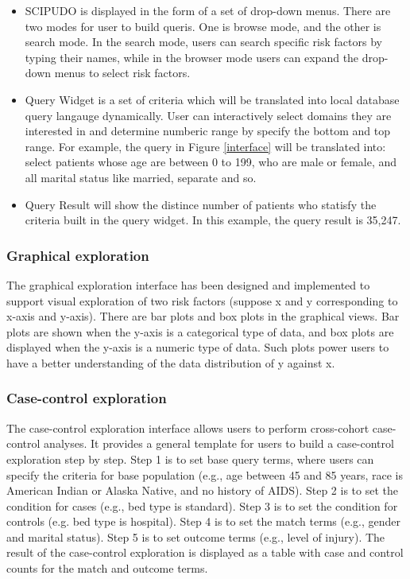 \documentclass{amia}
\begin{document}
\vspace{-3mm}
\begin{itemize}
\setlength\itemsep{0em}
  \item SCIPUDO is displayed in the form of a set of drop-down menus. There are two modes for user to build queris. One is browse mode, and the other is search mode. In the search mode, users can search specific risk factors by typing their names, while in the browser mode users can expand the drop-down menus to select risk factors.
  \item Query Widget is a set of criteria which will be translated into local database query langauge dynamically. User can interactively select domains they are interested in and determine numberic range by specify the bottom and top range. For example, the query in Figure \ref{interface} will be translated into: select patients whose age are between 0 to 199, who are male or female, and all marital status like married, separate and so. 
  \item Query Result will show the distince number of patients who statisfy the criteria built in the query widget. In this example, the query result is 35,247.
\end{itemize}
\vspace{-3mm}

\subsubsection{Graphical exploration}
The graphical exploration interface has been designed and implemented to support visual exploration of two risk factors (suppose x and y corresponding to x-axis and y-axis). There are bar plots and box plots in the graphical views. Bar plots are shown when the y-axis is a categorical type of data, and box plots are displayed when the y-axis is a numeric type of data. Such plots power users to have a better understanding of the data distribution of y against x.

\subsubsection{Case-control exploration}
The case-control exploration interface allows users to perform cross-cohort case-
control analyses. It provides a general template for users to build a case-control
exploration step by step. Step 1 is to set base query terms, where users can specify the criteria for base population (e.g., age between 45 and 85 years, race is American Indian or Alaska Native, and no history of AIDS). Step 2 is to set the condition for cases (e.g., bed type is standard). Step 3 is to set the condition for controls (e.g. bed type is hospital). Step 4 is to set the match terms (e.g., gender and marital status). Step 5 is to set outcome terms (e.g., level of injury). The result of the case-control exploration is displayed as a table with case and control counts for the match and outcome terms.
\end{document}
